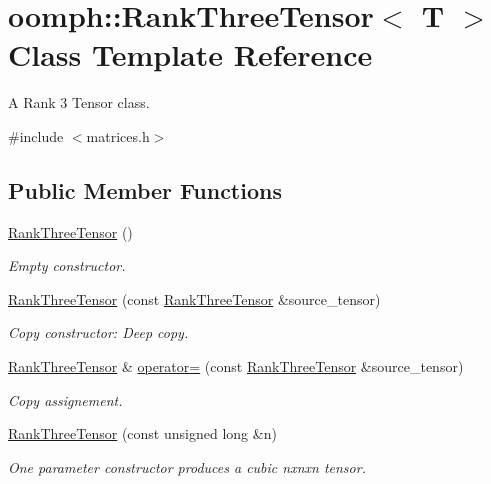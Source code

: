 \hypertarget{classoomph_1_1RankThreeTensor}{}\section{oomph\+:\+:Rank\+Three\+Tensor$<$ T $>$ Class Template Reference}
\label{classoomph_1_1RankThreeTensor}


A Rank 3 Tensor class.  




{\ttfamily \#include $<$matrices.\+h$>$}

\subsection*{Public Member Functions}
\begin{DoxyCompactItemize}
\item 
\hyperlink{classoomph_1_1RankThreeTensor_a8f2c4cf96f9e6c1c66e6958fd52b0b76}{Rank\+Three\+Tensor} ()
\begin{DoxyCompactList}\small\item\em Empty constructor. \end{DoxyCompactList}\item 
\hyperlink{classoomph_1_1RankThreeTensor_a7de68d66eec11565e0ffb55494fd66c6}{Rank\+Three\+Tensor} (const \hyperlink{classoomph_1_1RankThreeTensor}{Rank\+Three\+Tensor} \&source\+\_\+tensor)
\begin{DoxyCompactList}\small\item\em Copy constructor\+: Deep copy. \end{DoxyCompactList}\item 
\hyperlink{classoomph_1_1RankThreeTensor}{Rank\+Three\+Tensor} \& \hyperlink{classoomph_1_1RankThreeTensor_ad79699cce8e7432fa7ccf880345059f8}{operator=} (const \hyperlink{classoomph_1_1RankThreeTensor}{Rank\+Three\+Tensor} \&source\+\_\+tensor)
\begin{DoxyCompactList}\small\item\em Copy assignement. \end{DoxyCompactList}\item 
\hyperlink{classoomph_1_1RankThreeTensor_af3f6a2cc2032025608f5c8564c6da651}{Rank\+Three\+Tensor} (const unsigned long \&n)
\begin{DoxyCompactList}\small\item\em One parameter constructor produces a cubic nxnxn tensor. \end{DoxyCompactList}\item 

\end{DoxyCompactItemize}
